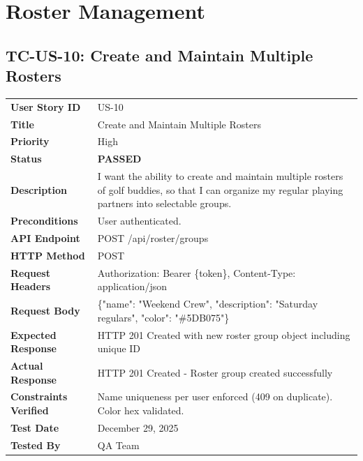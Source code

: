 \documentclass[11pt,a4paper]{article}
\newcommand{\passed}{\textcolor{pass}{\textbf{PASSED}}}
\begin{document}
\newpage


\section{Roster Management}

\subsection{TC-US-10: Create and Maintain Multiple Rosters}

\begin{tabularx}{\textwidth}{|p{3.2cm}|Y|}
\hline
{}
 \\
\hline
\textbf{User Story ID} & US-10 \\
\hline
\textbf{Title} & Create and Maintain Multiple Rosters \\
\hline
\textbf{Priority} & High \\
\hline
\textbf{Status} & \passed \\
\hline
\textbf{Description} & I want the ability to create and maintain multiple rosters of golf buddies, so that I can organize my regular playing partners into selectable groups. \\
\hline
\textbf{Preconditions} & User authenticated. \\
\hline
\textbf{API Endpoint} & POST /api/roster/groups \\
\hline
\textbf{HTTP Method} & POST \\
\hline
\textbf{Request Headers} & Authorization: Bearer \{token\}, Content-Type: application/json \\
\hline
\textbf{Request Body} & \{"name": "Weekend Crew", "description": "Saturday regulars", "color": "\#5DB075"\} \\
\hline
\textbf{Expected Response} & HTTP 201 Created with new roster group object including unique ID \\
\hline
\textbf{Actual Response} & HTTP 201 Created - Roster group created successfully \\
\hline
\textbf{Constraints Verified} & Name uniqueness per user enforced (409 on duplicate). Color hex validated. \\
\hline
\textbf{Test Date} & December 29, 2025 \\
\hline
\textbf{Tested By} & QA Team \\
\hline
\end{tabularx}
\end{document}
